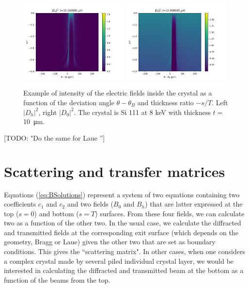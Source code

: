 \documentclass[preprint]{iucr}              %
\newcommand{\todo}[1]{{\color{red}[TODO: "#1'']}}
\begin{document}
\begin{figure}\label{fig:braggMap}
    \centering
    \includegraphics[width=0.49\textwidth]{figures/Bragg_DH.png}
    \includegraphics[width=0.49\textwidth]{figures/Bragg_D0.png}
    \caption{Example of intensity of the electric fields inside the crystal as a function of the 
    deviation angle $\theta-\theta_B$ and thickness ratio $-s/T$. 
    Left $|D_h|^2$, right $|D_0|^2$. 
    The crystal is Si 111 at 8 keV with thickness $t=$\SI{10}{\micro\meter}. 
    }
\end{figure}

\todo{Do the same for Laue }

\section{Scattering and transfer matrices}
\label{sec:matrices}
Equations (\ref{eq:BSolutions}) represent a system of two equations containing two coefficients $c_1$ and $c_2$ and two fields ($B_0$ and $B_h$) that are latter expressed at the top ($s=0$) and bottom ($s=T$) surfaces. From these four fields, we can calculate two as a function of the other two. In the usual case, we calculate the diffracted and transmitted fields at the corresponding exit surface (which depends on the geometry, Bragg or Laue) given the other two that are set as boundary conditions. This gives the ``scattering matrix". In other cases, when one considers a complex crystal made by several piled individual crystal layer, we would be interested in calculating the diffracted and transmitted beam at the bottom as a function of the beams from the top.   
\end{document}
